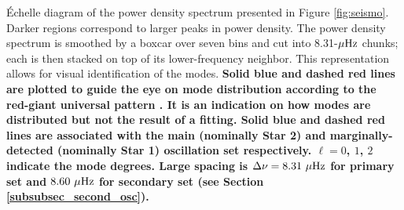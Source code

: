 \label{fig:echelle} \'Echelle diagram of the power density spectrum presented in Figure \ref{fig:seismo}. Darker regions correspond to larger peaks in power density. The power density spectrum is smoothed by a boxcar over seven bins and cut into 8.31-$\mu\rm{Hz}$ chunks; each is then stacked on top of its lower-frequency neighbor. This representation allows for visual identification of the modes. \textbf{Solid blue and dashed red lines are plotted to guide the eye on mode distribution according to the red-giant universal pattern \citep{mos11}. It is an indication on how modes are distributed but not the result of a fitting. Solid blue and dashed red lines are associated with the main (nominally Star 2) and marginally-detected (nominally Star 1) oscillation set respectively. $\ell = 0$, $1$, $2$ indicate the mode degrees. Large spacing is $\Delta\nu = 8.31\ \mu\rm{Hz}$ for primary set and $8.60\ \mu\rm{Hz}$ for secondary set (see Section \ref{subsubsec_second_osc}).}

  